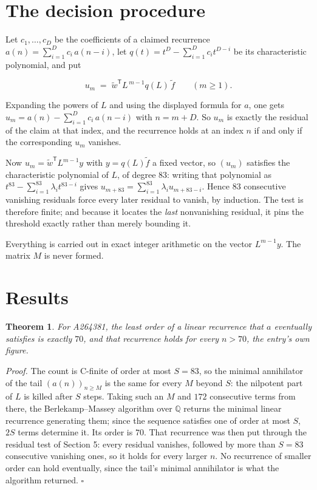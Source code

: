 \documentclass[11pt]{article}
\newtheorem{theorem}{Theorem}
\theoremstyle{definition}
\begin{document}
\section{The decision procedure}

Let $c_1,\dots,c_D$ be the coefficients of a claimed recurrence $a(n) = \sum_{i=1}^{D} c_i\,a(n-i)$, let $q(t) = t^{D} - \sum_{i=1}^{D} c_i t^{D-i}$ be its characteristic polynomial, and put

\[u_m \;=\; \tilde w^{\mathsf T} L^{\,m-1} q(L)\,\tilde f \qquad (m \ge 1).\]

Expanding the powers of $L$ and using the displayed formula for $a$, one gets $u_m = a(n) - \sum_{i=1}^{D} c_i\,a(n-i)$ with $n = m + D$. So $u_m$ is exactly the residual of the claim at that index, and the recurrence holds at an index $n$ if and only if the corresponding $u_m$ vanishes.

Now $u_m = \tilde w^{\mathsf T} L^{m-1} y$ with $y = q(L)\tilde f$ a fixed vector, so $(u_m)$ satisfies the characteristic polynomial of $L$, of degree $83$: writing that polynomial as $t^{83} - \sum_{i=1}^{83} \lambda_i t^{83-i}$ gives $u_{m+83} = \sum_{i=1}^{83} \lambda_i u_{m+83-i}$. Hence $83$ consecutive vanishing residuals force every later residual to vanish, by induction. The test is therefore finite; and because it locates the {\itshape last} nonvanishing residual, it pins the threshold exactly rather than merely bounding it.

Everything is carried out in exact integer arithmetic on the vector $L^{m-1}y$. The matrix $M$ is never formed.

\section{Results}

\begin{theorem} For A264381, the least order of a linear recurrence that $a$ eventually satisfies is exactly $70$, and that recurrence holds for every $n > 70$, the entry's own figure.\end{theorem}

{\itshape Proof.} The count is C-finite of order at most $S = 83$, so the minimal annihilator of the tail $(a(n))_{n \ge M}$ is the same for every $M$ beyond $S$: the nilpotent part of $L$ is killed after $S$ steps. Taking such an $M$ and $172$ consecutive terms from there, the Berlekamp--Massey algorithm over $\mathbb{Q}$ returns the minimal linear recurrence generating them; since the sequence satisfies one of order at most $S$, $2S$ terms determine it. Its order is $70$. That recurrence was then put through the residual test of Section 5: every residual vanishes, followed by more than $S = 83$ consecutive vanishing ones, so it holds for every larger $n$. No recurrence of smaller order can hold eventually, since the tail's minimal annihilator is what the algorithm returned. $\square$
\end{document}
